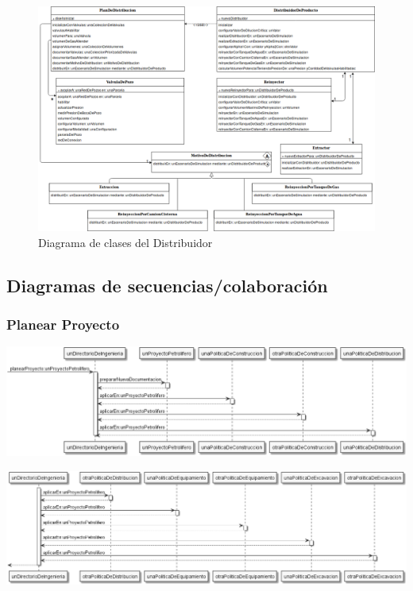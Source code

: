 \documentclass[10pt,a3paper, ,landscape]{article}
\begin{document}
\begin{figure}[H]
\centerline{\includegraphics[scale=0.8]{images/DiagramaDeClases_deDistribuidor.png}}
\caption{Diagrama de clases del Distribuidor}
\end{figure}

\pagebreak

\subsection{Diagramas de secuencias/colaboración}

\subsubsection{Planear Proyecto}

\centerline{\includegraphics[scale=0.9]{images/secuenciaPlanearProyecto1.png}}
\vspace{0.25cm}
\centerline{\includegraphics[scale=0.9]{images/secuenciaPlanearProyecto2.png}}
\end{document}
